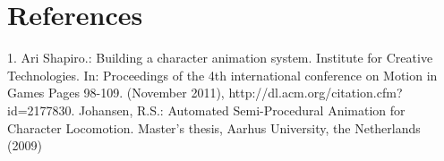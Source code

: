 \documentclass[options]{article}
\begin{document}
\section{\textbf{References}}
1. Ari Shapiro.: Building a character animation system. Institute for Creative Technologies. In: Proceedings of the 4th international conference on Motion in Games Pages 98-109. (November 2011), http://dl.acm.org/citation.cfm?id=2177830. Johansen, R.S.: Automated Semi-Procedural Animation for Character Locomotion. Master’s thesis, Aarhus University, the Netherlands (2009)
\end{document}
